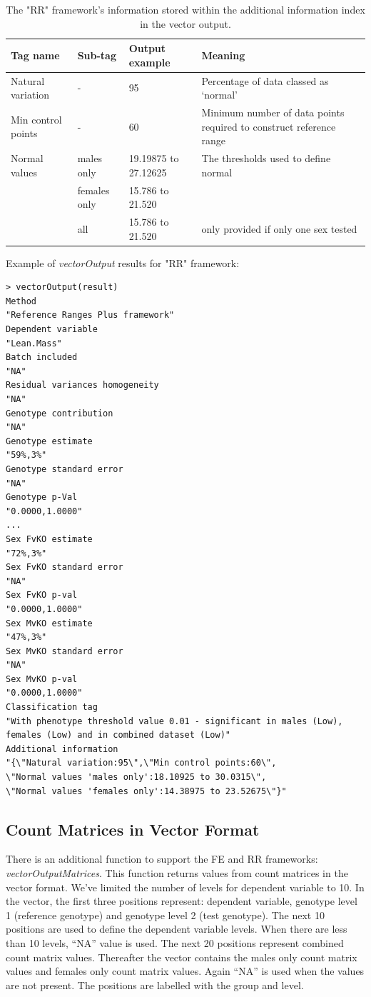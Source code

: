 \documentclass[12pt,a4paper]{article}
\begin{document}
\begin{table}
 
\begin{tabular}{| l | p{2.5cm} |  p{2cm}  | p{5cm} |}
  \hline
Tag name&Sub-tag&Output example&Meaning\\\hline
Natural variation&-&95&Percentage of data classed as ‘normal’\\
Min control points&-&60&
Minimum number of data points required to construct reference range\\
Normal values&males only&19.19875 to 27.12625&The thresholds used to define normal\\
&females only&15.786 to 21.520&\\
&all&15.786 to 21.520&only provided if only one sex tested\\
\hline  
\end{tabular}
\caption{The "RR" framework's information stored within the additional information index in the vector output. }\label{table:071}
\end{table}

Example of \textit{vectorOutput} results for "RR" framework:
\begingroup
\fontsize{8pt}{12pt}\selectfont
\begin{verbatim}
> vectorOutput(result)
Method 
"Reference Ranges Plus framework" 
Dependent variable 
"Lean.Mass" 
Batch included 
"NA" 
Residual variances homogeneity 
"NA" 
Genotype contribution 
"NA" 
Genotype estimate 
"59%,3%" 
Genotype standard error 
"NA" 
Genotype p-Val 
"0.0000,1.0000" 
... 
Sex FvKO estimate 
"72%,3%" 
Sex FvKO standard error 
"NA" 
Sex FvKO p-val 
"0.0000,1.0000" 
Sex MvKO estimate 
"47%,3%" 
Sex MvKO standard error 
"NA" 
Sex MvKO p-val 
"0.0000,1.0000" 
Classification tag 
"With phenotype threshold value 0.01 - significant in males (Low), females (Low) and in combined dataset (Low)" 
Additional information 
"{\"Natural variation:95\",\"Min control points:60\",
\"Normal values 'males only':18.10925 to 30.0315\",
\"Normal values 'females only':14.38975 to 23.52675\"}" 
\end{verbatim}
\endgroup

\subsection{Count Matrices in Vector Format}
There is an additional function to support the FE and RR frameworks: \textit{vectorOutputMatrices}. This function returns values from count matrices in the vector format.
We've limited the number of levels for dependent variable to 10. 
In the vector, the first three positions represent: dependent variable, genotype level 1 (reference genotype) and genotype level 2 (test genotype).
The next 10 positions are used to define the dependent variable levels. When there are less than 10 levels, ``NA'' value is used.
The next 20 positions represent combined count matrix values. Thereafter the vector contains the males only count matrix values and females only count matrix values. Again ``NA'' is used when the values are not present. The positions are labelled with the group and level.
\end{document}
